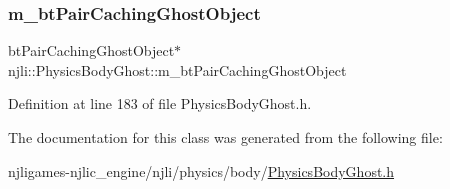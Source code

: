 \subsubsection{\texorpdfstring{m\+\_\+bt\+Pair\+Caching\+Ghost\+Object}{m\_btPairCachingGhostObject}}
{\footnotesize\ttfamily bt\+Pair\+Caching\+Ghost\+Object$\ast$ njli\+::\+Physics\+Body\+Ghost\+::m\+\_\+bt\+Pair\+Caching\+Ghost\+Object\hspace{0.3cm}{\ttfamily [private]}}



Definition at line 183 of file Physics\+Body\+Ghost.\+h.



The documentation for this class was generated from the following file\+:\begin{DoxyCompactItemize}
\item 
njligames-\/njlic\+\_\+engine/njli/physics/body/\mbox{\hyperlink{_physics_body_ghost_8h}{Physics\+Body\+Ghost.\+h}}\end{DoxyCompactItemize}
